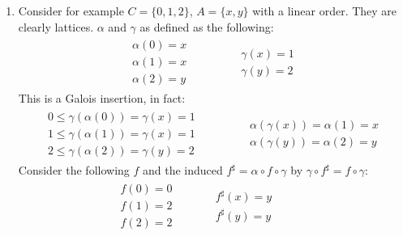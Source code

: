 \begin{exercise}
\begin{enumerate}[1.]
\begin{itemize}
        \end{itemize}
        \item Consider for example $C = \{0, 1, 2\}$, $A = \{x, y\}$ with a linear order. They are clearly lattices. $\alpha$ and $\gamma$ as defined as the following:
        \begin{gather*}
            \begin{aligned}
                \alpha(0) = x \\
                \alpha(1) = x \\
                \alpha(2) = y
            \end{aligned}
            \qquad\qquad
            \begin{aligned}
                \gamma(x) = 1 \\
                \gamma(y) = 2
            \end{aligned}
        \end{gather*}
        This is a Galois insertion, in fact:
        \begin{gather*}
            \begin{aligned}
                0 \leq \gamma(\alpha(0)) = \gamma(x) = 1 \\
                1 \leq \gamma(\alpha(1)) = \gamma(x) = 1 \\
                2 \leq \gamma(\alpha(2)) = \gamma(y) = 2
            \end{aligned}
            \qquad\qquad
            \begin{aligned}
                \alpha(\gamma(x)) = \alpha(1) = x \\
                \alpha(\gamma(y)) = \alpha(2) = y
            \end{aligned}
        \end{gather*}
        Consider the following $f$ and the induced $f^\sharp = \alpha \circ f \circ \gamma$ by $\gamma \circ f^\sharp = f \circ \gamma$:
        \begin{gather*}
            \begin{aligned}
                f(0) = 0 \\
                f(1) = 2 \\
                f(2) = 2
            \end{aligned}
            \qquad\quad
            \begin{aligned}
                f^\sharp (x) = y \\
                f^\sharp (y) = y
            \end{aligned}
            \qquad\quad

\end{gather*}
\end{enumerate}
\end{exercise}
